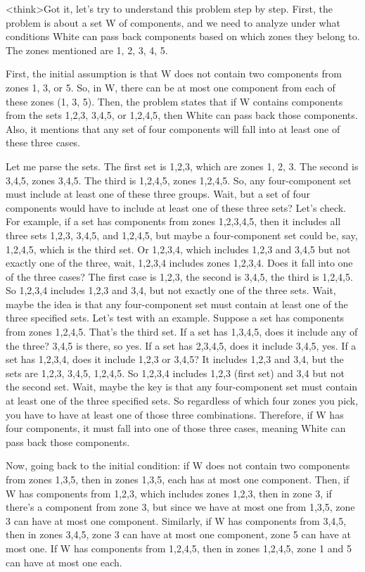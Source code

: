 <think>Got it, let's try to understand this problem step by step. First, the problem is about a set W of components, and we need to analyze under what conditions White can pass back components based on which zones they belong to. The zones mentioned are 1, 2, 3, 4, 5. 

First, the initial assumption is that W does not contain two components from zones 1, 3, or 5. So, in W, there can be at most one component from each of these zones (1, 3, 5). Then, the problem states that if W contains components from the sets {1,2,3}, {3,4,5}, or {1,2,4,5}, then White can pass back those components. Also, it mentions that any set of four components will fall into at least one of these three cases. 

Let me parse the sets. The first set is {1,2,3}, which are zones 1, 2, 3. The second is {3,4,5}, zones 3,4,5. The third is {1,2,4,5}, zones 1,2,4,5. So, any four-component set must include at least one of these three groups. Wait, but a set of four components would have to include at least one of these three sets? Let's check. For example, if a set has components from zones 1,2,3,4,5, then it includes all three sets {1,2,3}, {3,4,5}, and {1,2,4,5}, but maybe a four-component set could be, say, {1,2,4,5}, which is the third set. Or {1,2,3,4}, which includes {1,2,3} and {3,4,5} but not exactly one of the three, wait, {1,2,3,4} includes zones 1,2,3,4. Does it fall into one of the three cases? The first case is {1,2,3}, the second is {3,4,5}, the third is {1,2,4,5}. So {1,2,3,4} includes {1,2,3} and {3,4}, but not exactly one of the three sets. Wait, maybe the idea is that any four-component set must contain at least one of the three specified sets. Let's test with an example. Suppose a set has components from zones 1,2,4,5. That's the third set. If a set has 1,3,4,5, does it include any of the three? {3,4,5} is there, so yes. If a set has 2,3,4,5, does it include {3,4,5}, yes. If a set has 1,2,3,4, does it include {1,2,3} or {3,4,5}? It includes {1,2,3} and {3,4}, but the sets are {1,2,3}, {3,4,5}, {1,2,4,5}. So {1,2,3,4} includes {1,2,3} (first set) and {3,4} but not the second set. Wait, maybe the key is that any four-component set must contain at least one of the three specified sets. So regardless of which four zones you pick, you have to have at least one of those three combinations. Therefore, if W has four components, it must fall into one of those three cases, meaning White can pass back those components. 

Now, going back to the initial condition: if W does not contain two components from zones 1,3,5, then in zones 1,3,5, each has at most one component. Then, if W has components from {1,2,3}, which includes zones 1,2,3, then in zone 3, if there's a component from zone 3, but since we have at most one from 1,3,5, zone 3 can have at most one component. Similarly, if W has components from {3,4,5}, then in zones 3,4,5, zone 3 can have at most one component, zone 5 can have at most one. If W has components from {1,2,4,5}, then in zones 1,2,4,5, zone 1 and 5 can have at most one each. 

